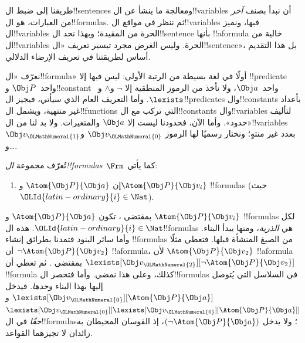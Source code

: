 \documentclass[../../../include/open-logic-section]{subfiles}
\begin{document}

\section{}

طريقنا إلى ضبط ال!!{sentence}s ومعالجة ما ينشأ عن ال!!{variable}s
أن نبدأ بصنف \emph{آخر} من العبارات، هو ال!!{formula}s. ثم
ننظر في مواقع ال!!{variable}s فيها، ونميز ال!!{variable}s الحرة
من المقيدة؛ وبهذا نحد ال!!{sentence} بأنها !!a{formula} خالية
من ال!!{variable}s الحرة. وليس الغرض مجرد تيسير تعريف
«ال!!{sentence}»، بل هذا التقديم أساس لطريقتنا في تعريف الإرضاء
الدلالي.

نعرّف «ال!!{formula}» أولًا في لغة بسيطة من الرتبة الأولى: ليس
فيها إلا !!{predicate} واحد~$\Obj P$ و!!{constant} واحد~$\Obj a$،
ولا نأخذ من الرموز المنطقية إلا $\lnot$ و$\land$ و~$\lexists$.
وأما التعريف العام الذي سيأتي، فيجيز ال!!{predicate}s
وال!!{constant}s بأعداد غير منتهية، ويشمل ال!!{function}s التي
تركب مع ال!!{constant}s وال!!{variable}s لتأليف «حدود». وأما الآن،
فحدودنا ليست إلا $\Obj a$ والمتغيرات. ولا بد لنا من
ال!!{variable}s بعدد غير منتهٍ؛ ونختار رسميًا لها الرموز
$\Obj v_\OLMathNumeral{0}$ و$\Obj v_\OLMathNumeral{1}$ و\dots.

\begin{defn}
تُعرّف مجموعة \emph{ال!!{formula}s}~$\Frm$ كما يأتي:
\begin{enumerate}
\item{} إن $\Atom{\Obj P}{\Obj a}$ و$\Atom{\Obj
  P}{\Obj v_i}$ !!{formula}s (حيث $\OLId{latin-ordinary}{i} \in \Nat$).




\end{enumerate}
\end{defn}

بمقتضى ، تكون $\Atom{\Obj P}{\Obj a}$ و
$\Atom{\Obj P}{\Obj v_i}$ !!{formula}s لكل $\OLId{latin-ordinary}{i} \in \Nat$.
هذه ال!!{formula}s هي \emph{الذرية}، ومنها يبدأ البناء.
وأما سائر البنود فتمدنا بطرائق إنشاء !!{formula}s من الصيغ
المنشأة قبلها. فتعطي  مثلًا أن
$\lnot \Atom{\Obj P}{\Obj v_2}$ !!a{formula}، لأن
$\Atom{\Obj P}{\Obj v_2}$ !!a{formula} بمقتضى
. ثم تعطي  أن
$\lexists[\Obj v_\OLMathNumeral{2}][\lnot \Atom{\Obj P}{\Obj v_2}]$
!!{formula} كذلك، وعلى هذا نمضي. وأما  فتحصر
ال!!{formula}s في السلاسل التي يُتوصل إليها بهذا البناء
\emph{وحدها}. فيدخل
$\lexists[\Obj v_\OLMathNumeral{0}][\Atom{\Obj P}{\Obj a}]$ و
$\lexists[\Obj v_\OLMathNumeral{0}][\lexists[\Obj v_\OLMathNumeral{0}][\Atom{\Obj P}{\Obj a}]]$
\emph{حقًا} في ال!!{formula}s؛ ولا يدخل
$(\lnot \Atom{\Obj P}{\Obj a})$، إذ القوسان المحيطان به زائدان
لا تجيزهما القواعد.
\end{document}
